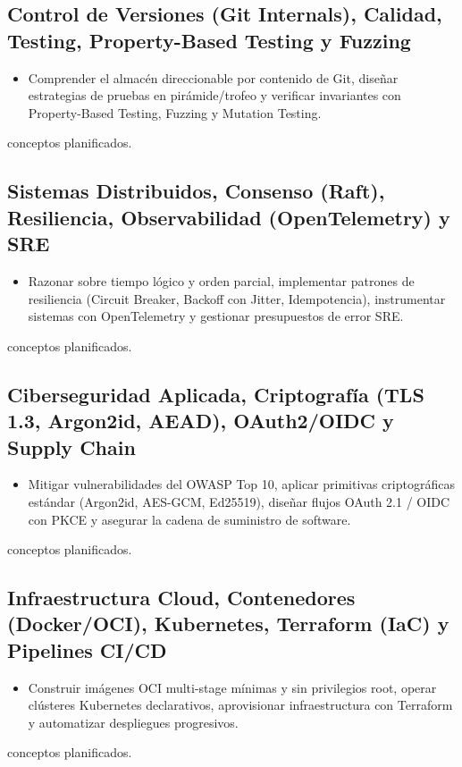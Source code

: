\documentclass{book}
\begin{document}
\subsection*{\checkmark Control de Versiones (Git Internals), Calidad, Testing, Property-Based Testing y Fuzzing}
\begin{itemize}
\item Comprender el almacén direccionable por contenido de Git, diseñar estrategias de pruebas en pirámide/trofeo y verificar invariantes con Property-Based Testing, Fuzzing y Mutation Testing.
\end{itemize}
 conceptos planificados.

\subsection*{\checkmark Sistemas Distribuidos, Consenso (Raft), Resiliencia, Observabilidad (OpenTelemetry) y SRE}
\begin{itemize}
\item Razonar sobre tiempo lógico y orden parcial, implementar patrones de resiliencia (Circuit Breaker, Backoff con Jitter, Idempotencia), instrumentar sistemas con OpenTelemetry y gestionar presupuestos de error SRE.
\end{itemize}
 conceptos planificados.

\subsection*{\checkmark Ciberseguridad Aplicada, Criptografía (TLS 1.3, Argon2id, AEAD), OAuth2/OIDC y Supply Chain}
\begin{itemize}
\item Mitigar vulnerabilidades del OWASP Top 10, aplicar primitivas criptográficas estándar (Argon2id, AES-GCM, Ed25519), diseñar flujos OAuth 2.1 / OIDC con PKCE y asegurar la cadena de suministro de software.
\end{itemize}
 conceptos planificados.

\subsection*{\checkmark Infraestructura Cloud, Contenedores (Docker/OCI), Kubernetes, Terraform (IaC) y Pipelines CI/CD}
\begin{itemize}
\item Construir imágenes OCI multi-stage mínimas y sin privilegios root, operar clústeres Kubernetes declarativos, aprovisionar infraestructura con Terraform y automatizar despliegues progresivos.
\end{itemize}
 conceptos planificados.
\end{document}

